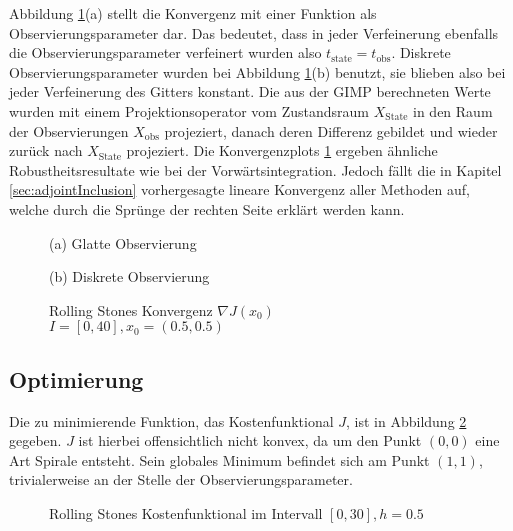 Abbildung \ref{fig:rollingStonesAdjoint}(a) stellt die Konvergenz mit einer Funktion als Observierungsparameter dar. Das bedeutet, dass in jeder Verfeinerung ebenfalls die Observierungsparameter verfeinert wurden also $t_{\text{state}} = t_{\text{obs}}$. Diskrete Observierungsparameter wurden bei Abbildung \ref{fig:rollingStonesAdjoint}(b) benutzt, sie blieben also bei jeder Verfeinerung des Gitters konstant. Die aus der GIMP berechneten Werte wurden mit einem Projektionsoperator vom Zustandsraum $X_{\text{State}}$ in den Raum der Observierungen $X_{\text{obs}}$ projeziert, danach deren Differenz gebildet und wieder zurück nach $X_{\text{State}}$ projeziert.
Die Konvergenzplots \ref{fig:rollingStonesAdjoint} ergeben ähnliche Robustheitsresultate wie bei der Vorwärtsintegration. 
Jedoch fällt die in Kapitel \ref{sec:adjointInclusion} vorhergesagte lineare Konvergenz aller Methoden auf, welche durch die Sprünge der rechten Seite erklärt werden kann.


\begin{figure}[H]
\footnotesize 
\centering
\begin{minipage}[b]{0.49\linewidth}

\caption*{(a) Glatte Observierung}
\end{minipage}
\begin{minipage}[b]{0.49\linewidth}

\caption*{(b) Diskrete Observierung}
\label{fig:rollingStonesAdjointDiscrete}
\end{minipage}
\caption{Rolling Stones Konvergenz $\nabla J(x_0)$\\ $I=[0,40],x_0=(0.5,0.5)$}
\label{fig:rollingStonesAdjoint}
\end{figure}

\subsection{Optimierung}
Die zu minimierende Funktion, das Kostenfunktional $J$, ist in Abbildung \ref{fig:rolling_costfunctional} gegeben. $J$ ist hierbei offensichtlich nicht konvex, da um den Punkt $(0,0)$ eine Art Spirale entsteht. Sein globales Minimum befindet sich am Punkt $(1,1)$, trivialerweise an der Stelle der Observierungsparameter. 
\begin{figure}[H]
\centering

\caption{Rolling Stones Kostenfunktional im Intervall $[0,30],h=0.5$}
\label{fig:rolling_costfunctional}
\end{figure}

